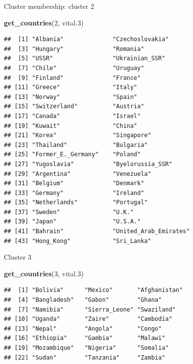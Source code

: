 \documentclass[ignorenonframetext,]{beamer}
\newenvironment{Shaded}{\begin{snugshade}}{\end{snugshade}}
\newcommand{\DecValTok}[1]{\textcolor[rgb]{0.00,0.00,0.81}{#1}}
\newcommand{\FloatTok}[1]{\textcolor[rgb]{0.00,0.00,0.81}{#1}}
\newcommand{\KeywordTok}[1]{\textcolor[rgb]{0.13,0.29,0.53}{\textbf{#1}}}
\newcommand{\NormalTok}[1]{#1}
\begin{document}
\begin{frame}[fragile]{Cluster membership: cluster 2}
\protect\hypertarget{cluster-membership-cluster-2}{}

\begin{Shaded}
\begin{Highlighting}[]
\KeywordTok{get_countries}\NormalTok{(}\DecValTok{2}\NormalTok{, vital}\FloatTok{.3}\NormalTok{)}
\end{Highlighting}
\end{Shaded}

\begin{verbatim}
##  [1] "Albania"              "Czechoslovakia"      
##  [3] "Hungary"              "Romania"             
##  [5] "USSR"                 "Ukrainian_SSR"       
##  [7] "Chile"                "Uruguay"             
##  [9] "Finland"              "France"              
## [11] "Greece"               "Italy"               
## [13] "Norway"               "Spain"               
## [15] "Switzerland"          "Austria"             
## [17] "Canada"               "Israel"              
## [19] "Kuwait"               "China"               
## [21] "Korea"                "Singapore"           
## [23] "Thailand"             "Bulgaria"            
## [25] "Former_E._Germany"    "Poland"              
## [27] "Yugoslavia"           "Byelorussia_SSR"     
## [29] "Argentina"            "Venezuela"           
## [31] "Belgium"              "Denmark"             
## [33] "Germany"              "Ireland"             
## [35] "Netherlands"          "Portugal"            
## [37] "Sweden"               "U.K."                
## [39] "Japan"                "U.S.A."              
## [41] "Bahrain"              "United_Arab_Emirates"
## [43] "Hong_Kong"            "Sri_Lanka"
\end{verbatim}

\end{frame}

\begin{frame}[fragile]{Cluster 3}
\protect\hypertarget{cluster-3}{}

\begin{Shaded}
\begin{Highlighting}[]
\KeywordTok{get_countries}\NormalTok{(}\DecValTok{3}\NormalTok{, vital}\FloatTok{.3}\NormalTok{)}
\end{Highlighting}
\end{Shaded}

\begin{verbatim}
##  [1] "Bolivia"      "Mexico"       "Afghanistan" 
##  [4] "Bangladesh"   "Gabon"        "Ghana"       
##  [7] "Namibia"      "Sierra_Leone" "Swaziland"   
## [10] "Uganda"       "Zaire"        "Cambodia"    
## [13] "Nepal"        "Angola"       "Congo"       
## [16] "Ethiopia"     "Gambia"       "Malawi"      
## [19] "Mozambique"   "Nigeria"      "Somalia"     
## [22] "Sudan"        "Tanzania"     "Zambia"
\end{verbatim}

\end{frame}
\end{document}
